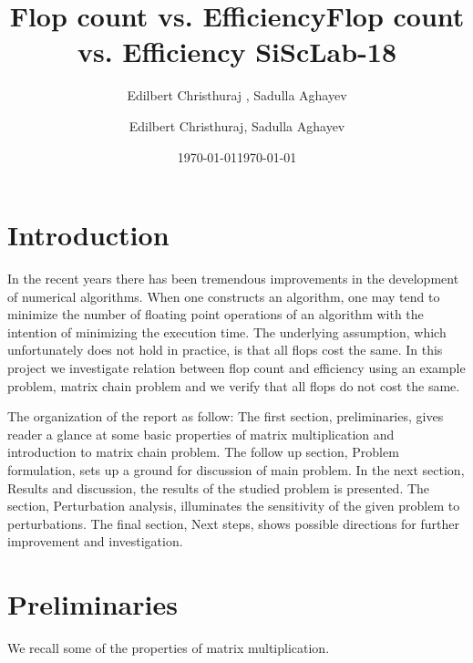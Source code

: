 \documentclass[10pts]{article}
\title{Flop count vs. Efficiency}
\author{Edilbert Christhuraj , Sadulla Aghayev}
\date{\today}
\begin{document}
\title{Flop count vs. Efficiency \hfill {\small \bf SiScLab-18}}
\author{Edilbert Christhuraj, Sadulla Aghayev}
\date{\today}

\maketitle




\section{Introduction}
	In the recent years there has been tremendous improvements in the development of numerical algorithms. When one constructs an algorithm, one may tend to minimize the number of floating point operations of an algorithm  with the intention of minimizing the execution time. The underlying assumption, which unfortunately does not hold in practice, is that all flops cost the same. In this project we investigate relation between flop count and efficiency using an example problem, matrix chain problem and we verify that all flops do not cost the same.
	
	The organization of the report as follow: The first section, preliminaries, gives reader a glance at some basic properties of matrix multiplication and introduction to matrix chain problem. The follow up section, Problem formulation, sets up a ground for discussion of main problem. In the next section, Results and discussion, the results of the studied problem is presented. The section, Perturbation analysis, illuminates the sensitivity of the given problem to perturbations. The final section, Next steps, shows possible directions for further improvement and investigation.


\section{Preliminaries}
We recall some of the properties of matrix multiplication. 
\end{document}
